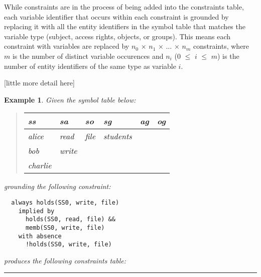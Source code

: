 \documentclass[10pt, twocolumn]{article}
\newtheorem{examp}{Example}
\newenvironment{example}{\begin{examp}\rm}{\rule{2mm}{2mm}\end{examp}}
\begin{document}
        While constraints are in the process of being added into the
        constraints table, each variable identifier that occurs within each
        constraint is grounded by replacing it with all the entity identifiers
        in the symbol table that matches the variable type (subject, access
        rights, objects, or groups). This means each constraint with variables
        are replaced by $n_0$ $\times$ $n_1$ $\times$ $\hdots$ $\times$ $n_m$
        constraints, where $m$ is the number of distinct variable occurences
        and $n_i$ ($0$ $\leq$ $i$ $\leq$ $m$) is the number of entity
        identifiers of the same type as variable $i$.

        [little more detail here]

        \begin{example}
          Given the symbol table below:

          \begin{quote}
            \begin{tabular}[t]{|l|l|l|l|l|l|}
              \hline
              \textbf{ss} & \textbf{sa} & \textbf{so} & \textbf{sg} & \textbf{ag} & \textbf{og} \\
              \hline
              alice & read & file & students & & \\
              bob & write & & & & \\
              charlie & & & & & \\
              \hline
            \end{tabular}
          \end{quote}

          grounding the following constraint:

          \begin{verbatim}
  always holds(SS0, write, file)
    implied by
      holds(SS0, read, file) &&
      memb(SS0, write, file)
    with absence
      !holds(SS0, write, file)
          \end{verbatim}

          produces the following constraints table:


\end{example}
\end{document}
